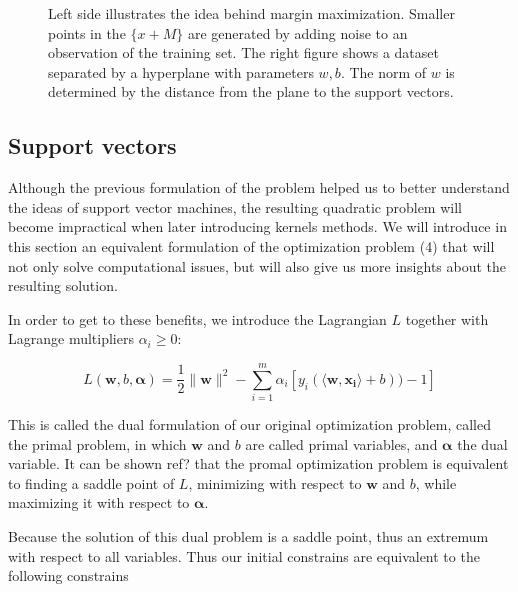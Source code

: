 \begin{figure*}
  \begin{minipage}{.5\textwidth}
    \centering
    
  \end{minipage}%
  \begin{minipage}{.5\textwidth}
    \centering
    
  \end{minipage}

  \caption{
    Left side illustrates the idea behind margin maximization. Smaller points in the $\{ x + M \}$ are generated by adding noise to an observation of the training set. The right figure shows a dataset separated by a hyperplane with parameters $w, b$. The norm of $w$ is determined by the distance from the plane to the support vectors.
  }
\end{figure*}

\subsection {Support vectors}

Although the previous formulation of the problem helped us to better understand the ideas of support vector machines, the resulting quadratic problem will become impractical when later introducing kernels methods. We will introduce in this section an equivalent formulation of the optimization problem (4) that will not only solve computational issues, but will also give us more insights about the resulting solution.

In order to get to these benefits, we introduce the Lagrangian $L$ together with Lagrange multipliers $\alpha_i \ge 0$:

\begin{equation}
  L(\mathbf{w}, b, \boldsymbol{\alpha}) = \frac{1}{2}\|\mathbf{w}\|^2 - \sum^m_{i=1} \alpha_i[y_i(\langle \mathbf{w}, \mathbf{x_i}\rangle + b)) - 1]
\end{equation}

This is called the dual formulation of our original optimization problem, called the primal problem, in which $\mathbf{w}$ and $b$ are called primal variables, and $\boldsymbol{\alpha}$ the dual variable. It can be shown \textcolor[rgb]{1,0,0}{ref?} that the promal optimization problem is equivalent to finding a saddle point of $L$, minimizing with respect to $\mathbf{w}$ and $b$, while maximizing it with respect to $
\boldsymbol{\alpha}$.

Because the solution of this dual problem is a saddle point, thus an extremum with respect to all variables. Thus our initial constrains are equivalent to the following constrains

